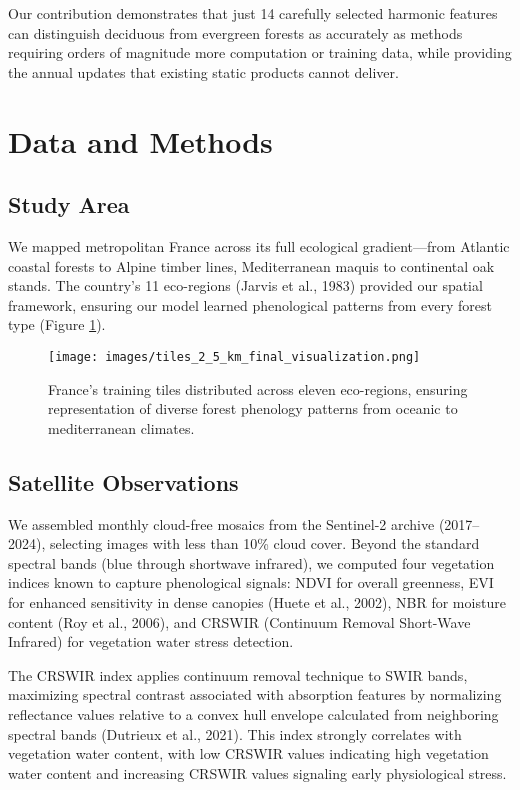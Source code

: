 \documentclass[utf8]{FrontiersinHarvard}
\begin{document}
Our contribution demonstrates that just 14 carefully selected harmonic features can distinguish deciduous from evergreen forests as accurately as methods requiring orders of magnitude more computation or training data, while providing the annual updates that existing static products cannot deliver.

\section{Data and Methods}

\subsection{Study Area}
We mapped metropolitan France across its full ecological gradient—from Atlantic coastal forests to Alpine timber lines, Mediterranean maquis to continental oak stands. The country's 11 eco-regions (Jarvis et al., 1983) provided our spatial framework, ensuring our model learned phenological patterns from every forest type (Figure \ref{fig:training_tiles}).

\begin{figure}[H]
    \centering
    \texttt{[image: images/tiles\_2\_5\_km\_final\_visualization.png]}
    \caption{France's training tiles distributed across eleven eco-regions, ensuring representation of diverse forest phenology patterns from oceanic to mediterranean climates.}
    \label{fig:training_tiles}
\end{figure}

\subsection{Satellite Observations}
We assembled monthly cloud-free mosaics from the Sentinel-2 archive (2017–2024), selecting images with less than 10\% cloud cover. Beyond the standard spectral bands (blue through shortwave infrared), we computed four vegetation indices known to capture phenological signals: NDVI for overall greenness, EVI for enhanced sensitivity in dense canopies (Huete et al., 2002), NBR for moisture content (Roy et al., 2006), and CRSWIR (Continuum Removal Short-Wave Infrared) for vegetation water stress detection.

The CRSWIR index applies continuum removal technique to SWIR bands, maximizing spectral contrast associated with absorption features by normalizing reflectance values relative to a convex hull envelope calculated from neighboring spectral bands (Dutrieux et al., 2021). This index strongly correlates with vegetation water content, with low CRSWIR values indicating high vegetation water content and increasing CRSWIR values signaling early physiological stress.
\end{document}
